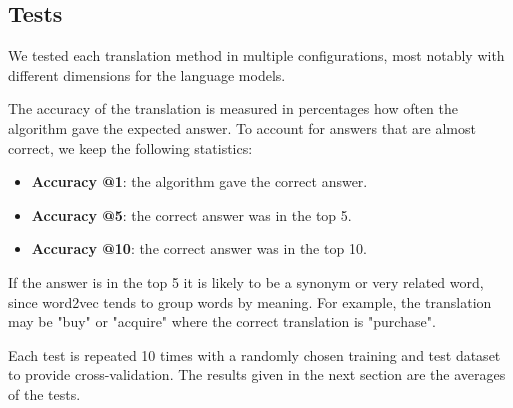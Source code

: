 \subsection{Tests}
We tested each translation method in multiple configurations, most notably with different dimensions for the language models.

The accuracy of the translation is measured in percentages how often the algorithm gave the expected answer. To account for answers that are almost correct, we keep the following statistics:
\begin{itemize}
	\item \textbf{Accuracy @1}: the algorithm gave the correct answer.
	\item \textbf{Accuracy @5}: the correct answer was in the top 5.
	\item \textbf{Accuracy @10}: the correct answer was in the top 10.
\end{itemize}

If the answer is in the top 5 it is likely to be a synonym or very related word, since word2vec tends to group words by meaning. For example, the translation may be "buy" or "acquire" where the correct translation is "purchase".

Each test is repeated 10 times with a randomly chosen training and test dataset to provide cross-validation. The results given in the next section are the averages of the tests.
